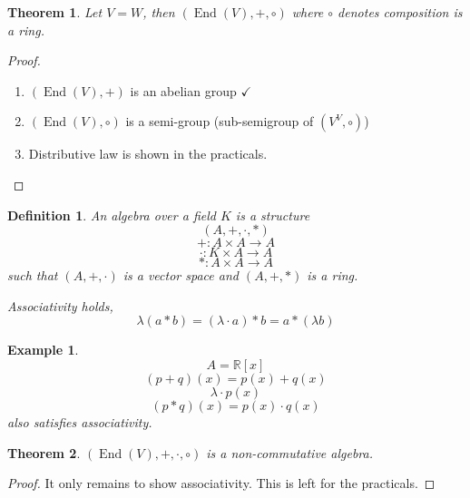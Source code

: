 \documentclass[a4paper,landscape,twocolumn]{article}
\newtheorem{theorem}{Theorem}[section]
\newtheorem{defi}{Definition}[section]
\newtheorem{ex}{Example}[section]
\DeclareMathOperator\End{End} %
\begin{document}
\begin{theorem}
  \label{satz-5-8}
  Let $V = W$, then $(\End(V), +, \circ)$ where $\circ$ denotes composition is a ring.
\end{theorem}
\begin{proof}
  \begin{enumerate}
    \item $(\End(V), +)$ is an abelian group $\checkmark$
    \item $(\End(V), \circ)$ is a semi-group (sub-semigroup of $(V^V, \circ)$)
    \item Distributive law is shown in the practicals.
  \end{enumerate}
\end{proof}

\begin{defi}
  An \emph{algebra} over a field $K$ is a structure
  \[ (A, +, \cdot, *) \]
  \[ +: A \times A \rightarrow A \]
  \[ \cdot: K \times A \rightarrow A \]
  \[ *: A \times A \rightarrow A \]
  such that $(A, +, \cdot)$ is a vector space and $(A, +, *)$ is a ring.

  Associativity holds,
  \[ \lambda (a * b) = (\lambda \cdot a) * b = a * (\lambda b) \]
\end{defi}

\begin{ex}
  \[ A = \mathbb R[x] \]
  \[ (p + q)(x) = p(x) + q(x) \]
  \[ \lambda \cdot p(x) \]
  \[ (p * q)(x) = p(x) \cdot q(x) \]
  also satisfies associativity.
\end{ex}

\begin{theorem}
  \label{satz-5-10}
  $(\End(V), +, \cdot, \circ)$ is a non-commutative algebra.
\end{theorem}
\begin{proof}
  It only remains to show associativity.
  This is left for the practicals.
\end{proof}
\end{document}
